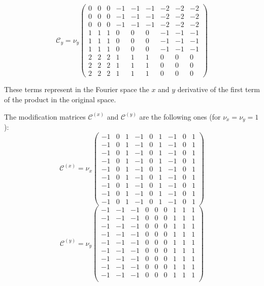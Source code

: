 \begin{equation}
\mathcal{C}_y= \nu_y
\begin{pmatrix}
   0 &  0 &  0 & -1 & -1 & -1 & -2 & -2 & -2\\
   0 &  0 &  0 & -1 & -1 & -1 & -2 & -2 & -2\\
   0 &  0 &  0 & -1 & -1 & -1 & -2 & -2 & -2\\
   1 &  1 &  1 &  0 &  0 &  0 & -1 & -1 & -1\\
   1 &  1 &  1 &  0 &  0 &  0 & -1 & -1 & -1\\
   1 &  1 &  1 &  0 &  0 &  0 & -1 & -1 & -1\\
   2 &  2 &  2 &  1 &  1 &  1 &  0 &  0 &  0\\
   2 &  2 &  2 &  1 &  1 &  1 &  0 &  0 &  0\\
   2 &  2 &  2 &  1 &  1 &  1 &  0 &  0 &  0
\end{pmatrix}
\end{equation}

These terms represent in the Fourier space the $x$ and $y$ derivative of the first term of the product in the original space.

The modification matrices $\mathcal{C}^{(x)}$ and $\mathcal{C}^{(y)}$ are the following ones (for $\nu_x=\nu_y=1$):
\begin{equation}
\mathcal{C}^{(x)}=\nu_x
\begin{pmatrix}
-1 &0 &1 &-1 &0 &1 &-1 &0 &1 \\
-1 &0 &1 &-1 &0 &1 &-1 &0 &1 \\
-1 &0 &1 &-1 &0 &1 &-1 &0 &1 \\
-1 &0 &1 &-1 &0 &1 &-1 &0 &1 \\
-1 &0 &1 &-1 &0 &1 &-1 &0 &1 \\
-1 &0 &1 &-1 &0 &1 &-1 &0 &1 \\
-1 &0 &1 &-1 &0 &1 &-1 &0 &1 \\
-1 &0 &1 &-1 &0 &1 &-1 &0 &1 \\
-1 &0 &1 &-1 &0 &1 &-1 &0 &1 
\end{pmatrix}
\end{equation}
\begin{equation}
\mathcal{C}^{(y)}=\nu_y
\begin{pmatrix}
  -1 &  -1 &  -1 &   0 &   0 &   0 &   1 &   1 &   1  \\ 
  -1 &  -1 &  -1 &   0 &   0 &   0 &   1 &   1 &   1  \\ 
  -1 &  -1 &  -1 &   0 &   0 &   0 &   1 &   1 &   1  \\ 
  -1 &  -1 &  -1 &   0 &   0 &   0 &   1 &   1 &   1  \\ 
  -1 &  -1 &  -1 &   0 &   0 &   0 &   1 &   1 &   1  \\ 
  -1 &  -1 &  -1 &   0 &   0 &   0 &   1 &   1 &   1  \\ 
  -1 &  -1 &  -1 &   0 &   0 &   0 &   1 &   1 &   1  \\ 
  -1 &  -1 &  -1 &   0 &   0 &   0 &   1 &   1 &   1  \\ 
  -1 &  -1 &  -1 &   0 &   0 &   0 &   1 &   1 &   1  \\
\end{pmatrix}
\end{equation}

